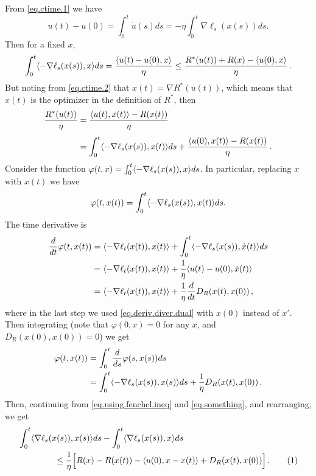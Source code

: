 \documentclass[12pt]{article}
\theoremstyle{plain}
\theoremstyle{definition}
\theoremstyle{remark}
\begin{document}
\noindent
From \eqref{eq.ctime.1} we have
$$
u(t) - u(0) = \int_{0}^{t} \dot{u}(s) ds = -\eta \int_{0}^{t} \nabla\ell_{s}(x(s)) ds.
$$
Then for a fixed $x$,
\begin{equation}
\int_{0}^{t} \langle {-\nabla\ell_{s}(x(s)), x}\rangle ds
= \frac{\langle {u(t) - u(0), x}\rangle}{\eta}
\leq \frac{R^{*}(u(t)) + R(x) - \langle {u(0),x}\rangle}{\eta}\,.
\label{eq.using.fenchel.ineq}
\end{equation}
But noting from \eqref{eq.ctime.2} that $x(t) = \nabla R^{*}(u(t))$, 
which means that $x(t)$ is the optimizer in the definition of $R^{*}$, 
then
\begin{align}
\frac{R^{*}(u(t))}{\eta}
&= \frac{\langle {u(t), x(t)}\rangle - R(x(t))}{\eta} \notag \\[1mm]
&= \int_{0}^{t} \langle {-\nabla\ell_{s}(x(s)), x(t)}\rangle ds + \frac{\langle {u(0),x(t)}\rangle-R(x(t))}{\eta}\,.
\label{eq.something}
\end{align}
Consider the function $\varphi(t,x) = \int_{0}^{t} \langle {-\nabla\ell_{s}(x(s)), x}\rangle ds$.
In particular, replacing $x$ with $x(t)$ we have
$$
\varphi(t,x(t)) = \int_{0}^{t} \langle {-\nabla\ell_{s}(x(s)), x(t)}\rangle ds.
$$
The time derivative is
\begin{align*}
\frac{d}{dt}\varphi(t,x(t))
&= \langle {-\nabla\ell_{t}(x(t)), x(t)}\rangle + \int_{0}^{t} \langle {-\nabla\ell_{s}(x(s)), \dot{x}(t)}\rangle ds \\
&= \langle {-\nabla\ell_{t}(x(t)), x(t)}\rangle + \frac{1}{\eta} \langle {u(t) - u(0), \dot{x}(t)}\rangle \\
&= \langle {-\nabla\ell_{t}(x(t)), x(t)}\rangle + \frac{1}{\eta} \frac{d}{dt} D_{R}(x(t), x(0)) \,,
\end{align*}
where in the last step we used \eqref{eq.deriv.diver.dual} with $x(0)$ instead of $x'$.
Then integrating
(note that $\varphi(0,x) = 0$ for any $x$, and $D_{R}(x(0), x(0)) = 0$) 
we get
\begin{align*}
\varphi(t,x(t)) 
&= \int_{0}^{t} \frac{d}{ds} \varphi(s,x(s)) ds \\
&= \int_{0}^{t} \langle {-\nabla\ell_{s}(x(s)), x(s)}\rangle ds 
     + \frac{1}{\eta} D_{R}(x(t), x(0)) \,.
\end{align*}
Then, continuing from \eqref{eq.using.fenchel.ineq} and \eqref{eq.something},
and rearranging, we get
\begin{align*}
&\int_{0}^{t} \ab{\nabla\ell_{s}(x(s)), x(s)} ds - \int_{0}^{t} \ab{\nabla\ell_{s}(x(s)), x} ds \\
&\hspace{1.5cm}
\leq \frac{1}{\eta} \Bigl[ R(x) - R(x(t)) - \ab{u(0), x - x(t)} + D_{R}(x(t), x(0)) \Bigr]\,.
\addtocounter{equation}{1}
\label{eq.bound.shaping}  \tag{\theequation}
\end{align*}
\end{document}

